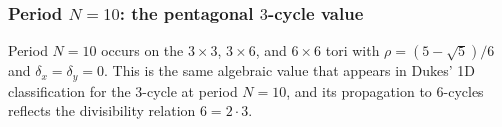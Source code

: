 \subsubsection{Period $N = 10$: the pentagonal $3$-cycle value}

Period $N = 10$ occurs on the $3 \times 3$, $3 \times 6$, and
$6 \times 6$ tori with $\rho = (5-\sqrt{5})/6$ and
$\delta_x = \delta_y = 0$. This is the same algebraic value that
appears in Dukes' 1D classification for the $3$-cycle at period
$N = 10$, and its propagation to $6$-cycles reflects the divisibility
relation $6 = 2 \cdot 3$.
